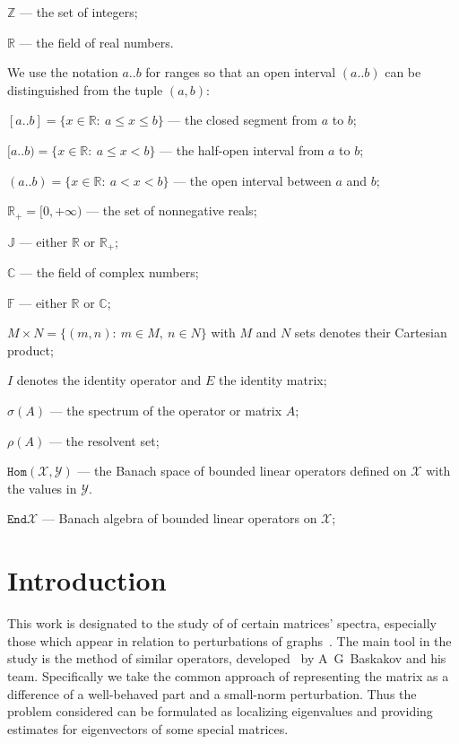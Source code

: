 \documentclass[14pt,a4paper]{extarticle}
\theoremstyle{definition}
\begin{document}
\( \mathbb{Z} \) --- the set of integers;

\( \mathbb{R} \) --- the field of real numbers.

We use the notation \( a..b \) for ranges so that an open interval \( (a..b) \)
can be distinguished from the tuple \( (a, b) \):

\( [a..b] = \{ x\in\mathbb{R}:\ a\leq x\leq b\} \) --- the closed segment from
\( a \) to \( b \);

\( [a..b) = \{ x\in\mathbb{R}:\ a\leq x < b\} \) --- the half-open interval from
\( a \) to \( b \);

\( (a..b) = \{ x\in\mathbb{R}:\ a < x < b\} \) --- the open interval between
\( a \) and \( b \);

\( \mathbb{R}_+ = [0,+\infty) \) --- the set of nonnegative reals;

\( \mathbb{J} \) --- either \( \mathbb{R} \) or \( \mathbb{R}_+ \);

\( \mathbb{C} \) --- the field of complex numbers;

\( \mathbb{F} \) --- either \( \mathbb{R} \) or \( \mathbb{C} \);

\( M{\times}N = \{ (m, n):\ m{\in}M,\ n{\in}N \} \) with \( M \) and \( N \) sets
denotes their Cartesian product;

\( I \) denotes the identity operator and \( E \) the identity matrix;

\( \sigma(A) \) --- the spectrum of the operator or matrix \( A \);

\( \rho(A) \) --- the resolvent set;

\( \mathtt{Hom}(\mathscr{X}, \mathscr{Y})\) --- the Banach space of bounded
linear operators defined on \( \mathscr{X} \) with the values in \( \mathscr{Y} \).

\( \mathtt{End}\mathscr{X} \) --- Banach algebra of bounded linear operators on
\( \mathscr{X} \);

\newpage

\section*{Introduction}
This work is designated to the study of of certain matrices' spectra,
especially those which appear in relation to
perturbations of graphs~\cite{cvetkovic1997eigenspaces}.
The main tool in the study is the method of similar
operators, developed~\cite{baskakov1986theorem,baskakov1987theorem,baskakov1994spectral,baskakov2002splitting}
by A~G~Baskakov and his team. Specifically we take the common approach of
representing the matrix as a difference of a well-behaved part and a small-norm
perturbation. Thus the problem considered can be formulated as localizing
eigenvalues and providing estimates for eigenvectors of some special matrices.
\end{document}
